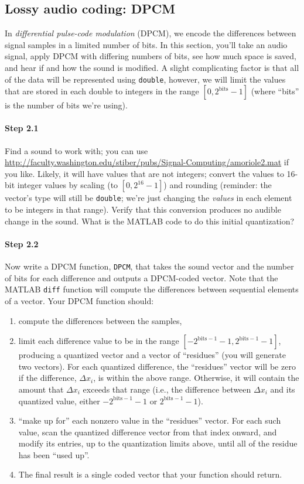 \subsection{Lossy audio coding: DPCM}

In \emph{differential pulse-code modulation} (DPCM), we encode the
differences between signal samples in a limited number of bits. In
this section, you'll take an audio signal, apply DPCM with differing
numbers of bits, see how much space is saved, and hear if and how the
sound is modified. A slight complicating factor is that all of the
data will be represented using \verb|double|, however, we will limit
the values that are stored in each double to integers in the range
$[0, 2^{\mathrm{bits}}-1]$ (where ``bits'' is the number of bits we're
using).

\paragraph{Step 2.1} Find a sound to work with; you can use
\url{http://faculty.washington.edu/stiber/pubs/Signal-Computing/amoriole2.mat}
if you like. Likely, it will have values that are not integers;
convert the values to 16-bit integer values by scaling (to $[0,
2^{16}-1]$) and rounding (reminder: the vector's type will still be
\verb|double|; we're just changing the \emph{values} in each element
to be integers in that range). Verify that this conversion produces no
audible change in the sound. What is the MATLAB code to do this
initial quantization?

\paragraph{Step 2.2} Now write a DPCM function, \verb|DPCM|, that
takes the sound vector and the number of bits for each difference and
outputs a DPCM-coded vector. Note that the MATLAB \verb|diff|
function will compute the differences between sequential elements of a
vector. Your DPCM function should:
\begin{enumerate}
\item compute the differences between the samples,
\item limit each difference value to be in the range
  $[-2^{\mathrm{bits}-1}-1, 2^{\mathrm{bits}-1}-1]$, producing a
  quantized vector and a vector of ``residues'' (you will generate two
  vectors). For each quantized difference, the ``residues'' vector
  will be zero if the difference, $\Delta x_i$, is within the above
  range. Otherwise, it will contain the amount that $\Delta x_i$
  exceeds that range (i.e., the difference between $\Delta x_i$ and
  its quantized value, either $-2^{\mathrm{bits}-1}-1$ or
  $2^{\mathrm{bits}-1}-1$).
\item ``make up for'' each nonzero value in the ``residues''
  vector. For each such value, scan the quantized difference vector
  from that index onward, and modify its entries, up to the
  quantization limits above, until all of the residue has been ``used
  up''.
\item The final result is a single coded vector that your function
  should return.
\end{enumerate}

